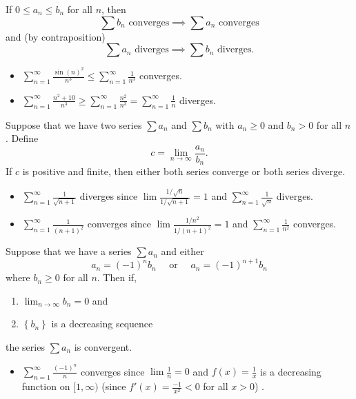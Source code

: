 \begin{thm}
If $0\leq a_n\leq b_n$ for all $n$, then
$$\sum b_n\text{ converges}\implies \sum a_n\text{ converges}$$
and (by contraposition)
$$\sum a_n\text{ diverges}\implies \sum b_n\text{ diverges}.$$
\end{thm}


\begin{itemize}
\item $\displaystyle \sum_{n=1}^\infty \frac{\sin(n)^2}{n^3} \leq \sum_{n=1}^\infty \frac{1}{n^3}$ converges.
\item $\displaystyle \sum_{n=1}^\infty \frac{n^2+10}{n^3} \geq \sum_{n=1}^\infty \frac{n^2}{n^3}=\sum_{n=1}^\infty \frac{1}{n}$ diverges.
\end{itemize}



\begin{thm}
Suppose that we have two series $\sum a_n$ and $\sum b_n$ with $a_n\geq 0$ and $b_n > 0$ for all $n$. Define
$$c=\lim_{n\to\infty}\frac{a_n}{b_n}.$$
If $c$ is positive and finite, then either both series converge or both series diverge.
\end{thm}


\begin{itemize}
\item $\displaystyle \sum_{n=1}^\infty \frac{1}{\sqrt{n+1}}$ diverges since $\lim \frac{1/\sqrt{n}}{1/\sqrt{n+1}}=1$ and $\displaystyle\sum_{n=1}^\infty \frac{1}{\sqrt{n}}$ diverges.
\item $\displaystyle \sum_{n=1}^\infty \frac{1}{(n+1)^2}$ converges since $\lim \frac{1/n^2}{1/(n+1)^2}=1$ and $\displaystyle\sum_{n=1}^\infty \frac{1}{n^2}$ converges.
\end{itemize}


\begin{thm}
Suppose that we have a series $\sum a_{n}$ and either $$a_{n}=(-1)^{n} b_{n}\quad\text{ or }\quad  a_{n}=(-1)^{n+1} b_{n}$$ where $b_{n} \geq 0$ for all $n .$ Then if,
\begin{enumerate}
    \item $\displaystyle\lim _{n \to \infty} b_{n}=0$ and
    \item $\left\{b_{n}\right\}$ is a decreasing sequence
\end{enumerate}
the series $\sum a_{n}$ is convergent.
\end{thm}


\begin{itemize}
\item $\displaystyle \sum_{n=1}^\infty \frac{(-1)^n}{n}$ converges since $\lim \frac1n=0$ and $f(x)=\frac{1}{x}$ is a decreasing function on $[1, \infty)$ (since $f'(x)=\frac{-1}{x^2}<0$ for all $x>0$) .
\end{itemize}



